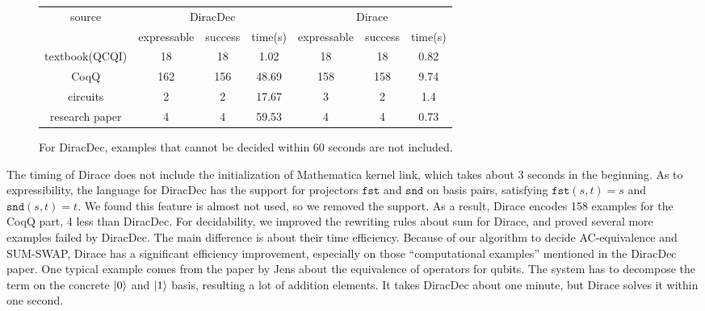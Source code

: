 \documentclass[runningheads]{llncs}
\begin{document}
\begin{figure}
    \center
    \begin{tabular}{c|c c c|c c c}
        \hline
        \multirow{2}{*}{source} & \multicolumn{3}{c|}{DiracDec} & \multicolumn{3}{c}{Dirace} \\
        \cline{2-7}
                                 & expressable & success & time(s)           & expressable & success & time(s)                 \\
        \hline
        textbook(QCQI)          & 18          & 18        &    1.02        &    18      & 18          &   0.82      \\
        CoqQ                    & 162          & 156       &    48.69       &   158     &  158   &     9.74     \\
        circuits                 & 2          & 2       &    17.67       &   3     &  2   &     1.4     \\
        research paper                & 4          & 4         &  59.53       &   4    & 4       &  0.73     \\
        \hline
    \end{tabular}        
    \caption{For DiracDec, examples that cannot be decided within 60 seconds are not included.}
\end{figure}

The timing of Dirace does not include the initialization of Mathematica kernel link, which takes about 3 seconds in the beginning.
As to expressibility, the language for DiracDec has the support for projectors $\texttt{fst}$ and $\texttt{snd}$ on basis pairs, satisfying $\texttt{fst} (s, t) = s$ and $\texttt{snd} (s, t) = t$. We found this feature is almost not used, so we removed the support. As a result, Dirace encodes 158 examples for the CoqQ part, 4 less than DiracDec. For decidability, we improved the rewriting rules about sum for Dirace, and proved several more examples failed by DiracDec. 
The main difference is about their time efficiency. Because of our algorithm to decide AC-equivalence and SUM-SWAP, Dirace has a significant efficiency improvement, especially on those ``computational examples'' mentioned in the DiracDec paper.
One typical example comes from the paper by Jens about the equivalence of operators for qubits. The system has to decompose the term on the concrete $\ket{0}$ and $\ket{1}$ basis, resulting a lot of addition elements. It takes DiracDec about one minute, but Dirace solves it within one second.
\end{document}
